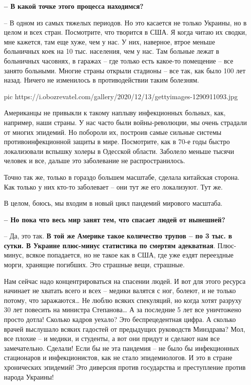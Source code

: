 \textbf{– В какой точке этого процесса находимся?}

– В одном из самых тяжелых периодов. Но это касается не только Украины, но в
целом и всех стран. Посмотрите, что творится в США. Я когда читаю их сводки,
мне кажется, там еще хуже, чем у нас. У них, наверное, втрое меньше больничных
коек на 10 тыс. населения, чем у нас. Там больные лежат в больничных часовнях,
в гаражах – где только есть какое-то помещение – все занято больными. Многие
страны открыли стадионы – все так, как было 100 лет назад. Ничего не изменилось
в противодействии таким болезням.

\ifcmt
pic https://i.obozrevatel.com/gallery/2020/12/13/gettyimages-1290911093.jpg
\fi

Американцы не привыкли к такому наплыву инфекционных больных, как, например,
наши страны. У нас часто были войны-революции, мы очень страдали от многих
эпидемий. Но побороли их, построив самые сильные системы противоинфекционной
защиты в мире. Посмотрите, как в 70-е годы быстро локализовали вспышку холеры в
Одесской области. Заболело меньше тысячи человек и все, дальше это заболевание
не распространилось.

Точно так же, только в гораздо большем масштабе, сделала китайская сторона. Как
только у них кто-то заболевает – они тут же его локализуют. Тут же.

В целом, боюсь, мы входим в новый цикл пандемий мирового масштаба.

\textbf{– Но пока что весь мир занят тем, что спасает людей от нынешней?}

– Да, это так. \textbf{В той же Америке такое количество трупов – по 3 тыс. в сутки. В
Украине плюс-минус статистика по смертям адекватная}. Плюс-минус, всякое
попадается, но не такое как в США, где уже ездят переездные морги, хранящие
погибших. Это страшные вещи, страшные.

Нам сейчас надо концентрироваться на спасении людей. И вот для этого ресурса
начинает не хватать всего и всех – медики валятся с ног, болеют, и не только
потому, что заражаются… Не люблю всяких спекуляций, но когда хотят разруху 30
лет повесить на министра Степанова… А за последние 5 лет все уничтожено просто
дотла! Сколько кадров уехало? Это беспрецедентная цифра. А сколько врачей
выслушало всяких гадостей от предыдущих руководств Минздрава? Мол, все плохие –
и медики, и студенты, а вот они придут и сделают нам все замечательно. Сделали!
Если бы не эта пандемия – не было бы инфекционных стационаров и инфекционистов,
как не стало эпидемиологов. И это в стране хронических эпидемий! Это диверсия
против государства и преступление против народа Украины!

